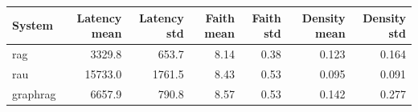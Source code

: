 \begin{tabular}{lrrrrrr}
\toprule
System & Latency mean & Latency std & Faith mean & Faith std & Density mean & Density std \\
\midrule
rag & 3329.8 & 653.7 & 8.14 & 0.38 & 0.123 & 0.164 \\
rau & 15733.0 & 1761.5 & 8.43 & 0.53 & 0.095 & 0.091 \\
graphrag & 6657.9 & 790.8 & 8.57 & 0.53 & 0.142 & 0.277 \\
\bottomrule
\end{tabular}
